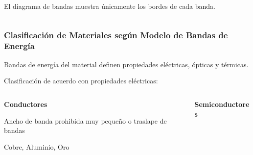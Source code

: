 \documentclass[10pt,t,aspectratio=169]{beamer}
\begin{document}
\begin{frame}[t]
\begin{columns}
\begin{column}{0.4\textwidth}
            \centering
            \small{El diagrama de bandas muestra únicamente los bordes de cada banda.}
        \end{column}
    \end{columns}
\end{frame}


\begin{frame}[t]
    \frametitle{Clasificación de Materiales según Modelo de Bandas de Energía}

    Bandas de energía del material definen propiedades eléctricas, ópticas y térmicas.

    \vspace{3mm}
    Clasificación de acuerdo con propiedades eléctricas:
    
    \vspace{3mm}
    \begin{columns}
        \begin{column}{0.33\textwidth}
            \centering
            \textbf{Conductores}

            \vspace{3mm}

            Ancho de banda prohibida muy pequeño o traslape de bandas

            Cobre, Aluminio, Oro

        \end{column}
        \begin{column}{0.33\textwidth}
            \centering
            \textbf{Semiconductores}

            \vspace{3mm}


\end{column}
\end{columns}
\end{frame}
\end{document}

